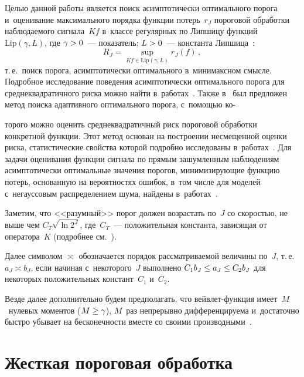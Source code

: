 \begin{multicols}{2}
Целью данной работы является поиск асимптотически оптимального 
порога и~оценивание максимального порядка функции потерь~$r_J$ пороговой 
обработки наблюдаемого сигнала~$Kf$ в~классе регулярных по Липшицу 
функций $\mathrm{Lip}(\gamma,L)$, где $\gamma\hm>0$~--- показатель; 
$L\hm>0$~--- константа Липшица~\cite{Mal99}:
\noindent
\begin{equation}
\label{Risk_Definition}
R_J=\sup\limits_{Kf\in\mathrm{Lip}(\gamma,L)}{r_J(f)}\,,
\end{equation}
т.\,е.\ поиск порога, асимптотически оптимального в~минимаксном смысле. 
Подробное исследование поведения асимптотически оптимального порога 
для среднеквадратичного рис\-ка можно найти в~работах~\cite{DJ98, Jan01}. 
Также в~\cite{DJ95} был предложен метод поиска адаптивного оптимального порога,
 с~по\-мощью ко-\linebreak\vspace*{-12pt}
 
 \pagebreak
 
 \noindent
 торого можно оценить среднеквадратичный риск пороговой
  обработки конкретной функции. Этот метод основан на построении несмещенной 
  оценки риска, статистические свойства которой подробно исследованы 
  в~работах~\cite{MSH10, SH12}. Для задачи оценивания функции сигнала по 
  прямым зашумленным наблюдениям асимптотически оптимальные значения порогов, 
  минимизирующие функцию потерь, основанную на вероятностях ошибок, в~том 
  числе для моделей с~негауссовым распределением шума, найдены 
  в~работах~\cite{KS16-1, KS16-2}.

Заметим, что <<разумный>> порог должен воз\-рас\-тать по~$J$ со ско\-ростью, 
не выше чем $C_T\sqrt{\ln2^J}$, где~$C_T$~--- 
положительная константа, зависящая от оператора~$K$ 
(подробнее см.~\cite{Abr98, Jan01}).

Далее символом $\asymp$ обозначается порядок рассматриваемой величины по~$J$, 
т.\,е.\ $a_J\asymp b_J$, если начиная с~некоторого~$J$ выполнено 
$C_1  b_J\hm\leq a_J\hm\leq  C_2 b_J$ для некоторых положительных констант~$C_1$ 
и~$C_2$.

Везде далее дополнительно будем предполагать, что вейв\-лет-функ\-ция имеет~$M$~нулевых 
моментов ($M\hm\geq\gamma$), $M$~раз непрерывно дифференцируема и~достаточно быст\-ро 
убывает на бес\-ко\-неч\-ности вместе со своими производными~\cite{Mal99}.

\vspace*{-6pt}

\section{Жесткая пороговая обработка}


\end{multicols}
